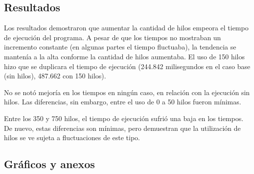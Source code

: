 \documentclass[conference]{IEEEtran}
\begin{document}
\subsection*{Resultados}

    Los resultados demostraron que aumentar la cantidad de hilos empeora el tiempo de ejecución del programa. A pesar de que los tiempos no mostraban un incremento constante (en algunas partes el tiempo fluctuaba), la tendencia se mantenía a la alta conforme la cantidad de hilos aumentaba. El uso de 150 hilos hizo que se duplicara el tiempo de ejecución (244.842 milisegundos en el caso base (sin hilos), 487.662 con 150 hilos). \newline 
    
        No se notó mejoría en los tiempos en ningún caso, en relación con la ejecución sin hilos. Las diferencias, sin embargo, entre el uso de 0 a 50 hilos fueron mínimas. \newline
        
        Entre los 350 y 750 hilos, el tiempo de ejecución sufrió una baja en los tiempos. De nuevo, estas diferencias son mínimas, pero demuestran que la utilización de hilos se ve sujeta a fluctuaciones de este tipo.
        
      
\subsection*{Gráficos y anexos}



\end{document}

